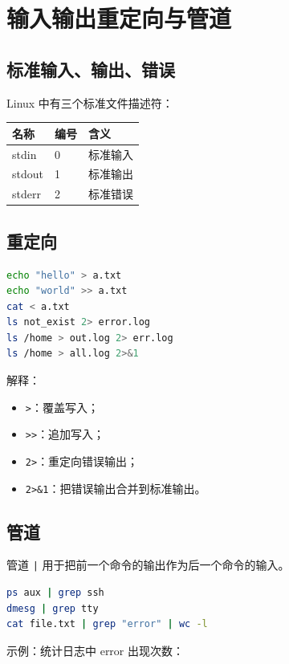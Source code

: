 \documentclass[UTF8,a4paper,12pt]{ctexart}
\begin{document}
\section{输入输出重定向与管道}

\subsection{标准输入、输出、错误}

Linux 中有三个标准文件描述符：

\begin{longtable}{p{4cm}p{4cm}p{6cm}}
\toprule
名称 & 编号 & 含义 \\
\midrule
stdin & 0 & 标准输入 \\
stdout & 1 & 标准输出 \\
stderr & 2 & 标准错误 \\
\bottomrule
\end{longtable}

\subsection{重定向}

\begin{lstlisting}[language=bash]
echo "hello" > a.txt
echo "world" >> a.txt
cat < a.txt
ls not_exist 2> error.log
ls /home > out.log 2> err.log
ls /home > all.log 2>&1
\end{lstlisting}

解释：
\begin{itemize}
    \item \texttt{>}：覆盖写入；
    \item \texttt{>>}：追加写入；
    \item \texttt{2>}：重定向错误输出；
    \item \texttt{2>\&1}：把错误输出合并到标准输出。
\end{itemize}

\subsection{管道}

管道 \texttt{|} 用于把前一个命令的输出作为后一个命令的输入。

\begin{lstlisting}[language=bash]
ps aux | grep ssh
dmesg | grep tty
cat file.txt | grep "error" | wc -l
\end{lstlisting}

示例：统计日志中 error 出现次数：
\end{document}
